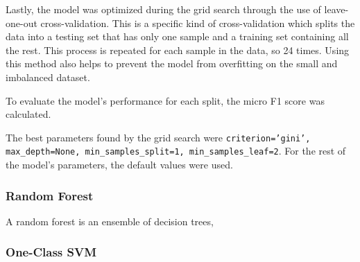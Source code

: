 \documentclass[12pt,a4paper]{article}
\numberwithin{figure}{section}
\numberwithin{table}{section}
\numberwithin{definition}{section}
\begin{document}
Lastly, the model was optimized during the grid search through the use of leave-one-out cross-validation. This is a specific kind of cross-validation which splits the data into a testing set that has only one sample and a training set containing all the rest. This process is repeated for each sample in the data, so 24 times. Using this method also helps to prevent the model from overfitting on the small and imbalanced dataset. 

To evaluate the model's performance for each split, the micro F1 score was calculated. 

The best parameters found by the grid search were \texttt{criterion='gini', max\_depth=None, min\_samples\_split=1, min\_samples\_leaf=2}. For the rest of the model's parameters, the default values were used.

\subsubsection{Random Forest}
\label{ssec:randomforest}


A random forest is an ensemble of decision trees,

\subsubsection{One-Class SVM}
\label{ssec:oneclasssvm}

\end{document}
